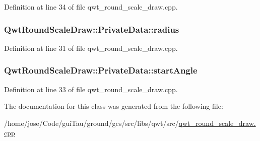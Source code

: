 Definition at line 34 of file qwt\-\_\-round\-\_\-scale\-\_\-draw.\-cpp.

\hypertarget{class_qwt_round_scale_draw_1_1_private_data_a91d68095489466256eff9645dfea424f}{
\subsubsection[{radius}]{ Qwt\-Round\-Scale\-Draw\-::\-Private\-Data\-::radius}}\label{class_qwt_round_scale_draw_1_1_private_data_a91d68095489466256eff9645dfea424f}


Definition at line 31 of file qwt\-\_\-round\-\_\-scale\-\_\-draw.\-cpp.

\hypertarget{class_qwt_round_scale_draw_1_1_private_data_a500bc10db11a7e3c9b290b80b29d39b0}{
\subsubsection[{start\-Angle}]{ Qwt\-Round\-Scale\-Draw\-::\-Private\-Data\-::start\-Angle}}\label{class_qwt_round_scale_draw_1_1_private_data_a500bc10db11a7e3c9b290b80b29d39b0}


Definition at line 33 of file qwt\-\_\-round\-\_\-scale\-\_\-draw.\-cpp.



The documentation for this class was generated from the following file\-:\begin{DoxyCompactItemize}
\item 
/home/jose/\-Code/gui\-Tau/ground/gcs/src/libs/qwt/src/\hyperlink{qwt__round__scale__draw_8cpp}{qwt\-\_\-round\-\_\-scale\-\_\-draw.\-cpp}\end{DoxyCompactItemize}
